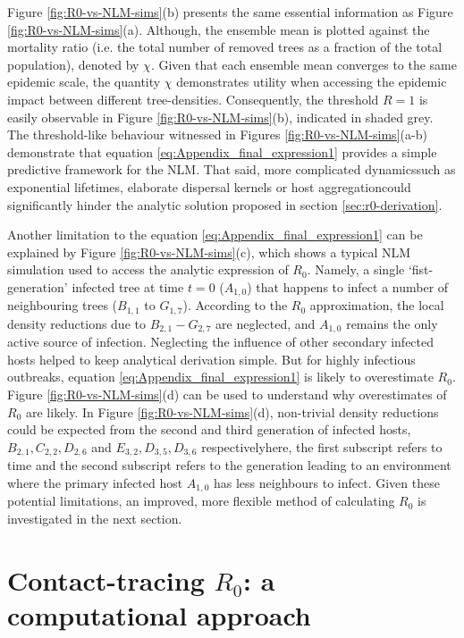 Figure \ref{fig:R0-vs-NLM-sims}(b) presents the same essential information as Figure \ref{fig:R0-vs-NLM-sims}(a).
Although, the ensemble mean is plotted against the mortality ratio (i.e. the total number of removed trees as a fraction of the total population), denoted by $\chi$.
Given that each ensemble mean converges to the same epidemic scale, the quantity $\chi$ demonstrates utility when accessing the epidemic impact between different tree-densities.
Consequently, the threshold $R=1$ is easily observable in Figure \ref{fig:R0-vs-NLM-sims}(b), indicated in shaded grey.
The threshold-like behaviour witnessed in Figures \ref{fig:R0-vs-NLM-sims}(a-b) demonstrate that equation \ref{eq:Appendix_final_expression1} provides a simple predictive framework for the  NLM.
That said, more complicated dynamics\textemdash such as exponential lifetimes, elaborate dispersal kernels or host aggregation\textemdash could significantly hinder the analytic solution proposed in section \ref{sec:r0-derivation}.

Another limitation to the equation \ref{eq:Appendix_final_expression1} can be explained by Figure \ref{fig:R0-vs-NLM-sims}(c), which shows a typical NLM simulation used to access the analytic expression of $R_0$.
Namely, a single `fist-generation' infected tree at time $t=0$ ($A_{1, 0}$) that happens to infect a number of neighbouring trees ($B_{1,1}$ to $G_{1, 7}$).
According to the $R_0$ approximation, the local density reductions due to $B_{2,1}-G_{2, 7}$ are neglected, and $A_{1, 0}$ remains the only active source of infection.
Neglecting the influence of other secondary infected hosts helped to keep analytical derivation simple.
But for highly infectious outbreaks, equation \ref{eq:Appendix_final_expression1} is likely to overestimate $R_0$.
Figure \ref{fig:R0-vs-NLM-sims}(d) can be used to understand why overestimates of $R_0$ are likely.
In Figure \ref{fig:R0-vs-NLM-sims}(d), non-trivial density reductions could be expected from the second and third generation of infected hosts, $B_{2,1}, C_{2, 2}, D_{2, 6}$ and $E_{3, 2}, D_{3, 5}, D_{3, 6}$ respectively\textemdash here, the first subscript refers to time and the second subscript refers to the generation\textemdash 
leading to an environment where the primary infected host $A_{1, 0}$ has less neighbours to infect.
Given these potential limitations, an improved, more flexible method of calculating $R_0$ is investigated in the next section.

\section{Contact-tracing $R_0$: a computational approach}
\label{sec:contract-traced-R0}

